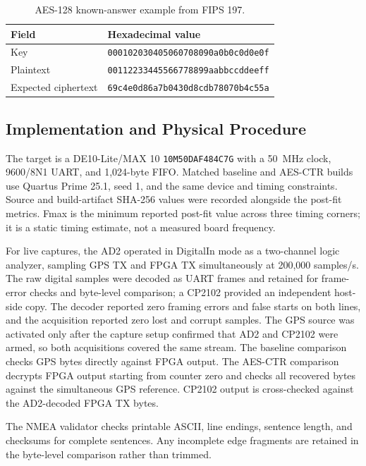 \documentclass[runningheads]{llncs}
\begin{document}
\begin{table}[H]
\caption{AES-128 known-answer example from FIPS 197.}
\label{tab:kat}
\centering
\small
\begin{tabular}{ll}
\hline
Field & Hexadecimal value \\
\hline
Key & \texttt{000102030405060708090a0b0c0d0e0f} \\
Plaintext & \texttt{00112233445566778899aabbccddeeff} \\
Expected ciphertext & \texttt{69c4e0d86a7b0430d8cdb78070b4c55a} \\
\hline
\end{tabular}
\end{table}

\subsection{Implementation and Physical Procedure}
The target is a DE10-Lite/MAX 10 \texttt{10M50DAF484C7G} with a 50~MHz clock, 9600/8N1 UART, and 1,024-byte FIFO. Matched baseline and AES-CTR builds use Quartus Prime 25.1, seed 1, and the same device and timing constraints. Source and build-artifact SHA-256 values were recorded alongside the post-fit metrics. Fmax is the minimum reported post-fit value across three timing corners; it is a static timing estimate, not a measured board frequency.

For live captures, the AD2 operated in DigitalIn mode as a two-channel logic analyzer, sampling GPS TX and FPGA TX simultaneously at 200,000 samples/s. The raw digital samples were decoded as UART frames and retained for frame-error checks and byte-level comparison; a CP2102 provided an independent host-side copy. The decoder reported zero framing errors and false starts on both lines, and the acquisition reported zero lost and corrupt samples. The GPS source was activated only after the capture setup confirmed that AD2 and CP2102 were armed, so both acquisitions covered the same stream. The baseline comparison checks GPS bytes directly against FPGA output. The AES-CTR comparison decrypts FPGA output starting from counter zero and checks all recovered bytes against the simultaneous GPS reference. CP2102 output is cross-checked against the AD2-decoded FPGA TX bytes.

The NMEA validator checks printable ASCII, line endings, sentence length, and checksums for complete sentences. Any incomplete edge fragments are retained in the byte-level comparison rather than trimmed.
\end{document}
